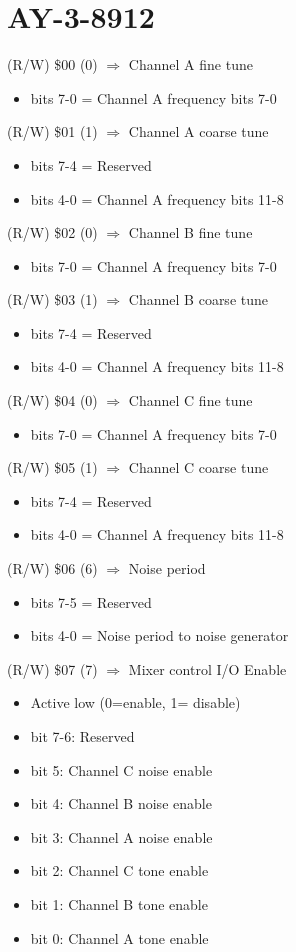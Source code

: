 \section{AY-3-8912}

(R/W) \$00 (0) $\Rightarrow$ Channel A fine tune
\begin{itemize}
\item bits 7-0 = Channel A frequency bits 7-0
\end{itemize}

(R/W) \$01 (1) $\Rightarrow$ Channel A coarse tune
\begin{itemize}
\item bits 7-4 = Reserved
\item bits 4-0 = Channel A frequency bits 11-8
\end{itemize}

(R/W) \$02 (0) $\Rightarrow$ Channel B fine tune
\begin{itemize}
\item bits 7-0 = Channel A frequency bits 7-0
\end{itemize}

(R/W) \$03 (1) $\Rightarrow$ Channel B coarse tune
\begin{itemize}
\item bits 7-4 = Reserved
\item bits 4-0 = Channel A frequency bits 11-8
\end{itemize}

(R/W) \$04 (0) $\Rightarrow$ Channel C fine tune
\begin{itemize}
\item bits 7-0 = Channel A frequency bits 7-0
\end{itemize}

(R/W) \$05 (1) $\Rightarrow$ Channel C coarse tune
\begin{itemize}
\item bits 7-4 = Reserved
\item bits 4-0 = Channel A frequency bits 11-8
\end{itemize}

(R/W) \$06 (6) $\Rightarrow$ Noise period
\begin{itemize}
\item bits 7-5 = Reserved
\item bits 4-0 = Noise period to noise generator
\end{itemize}

(R/W) \$07 (7) $\Rightarrow$ Mixer control I/O Enable
\begin{itemize}
\item[] Active low (0=enable, 1= disable)
\item bit 7-6: Reserved
\item bit 5: Channel C noise enable
\item bit 4: Channel B noise enable
\item bit 3: Channel A noise enable
\item bit 2: Channel C tone enable
\item bit 1: Channel B tone enable
\item bit 0: Channel A tone enable
\end{itemize}

